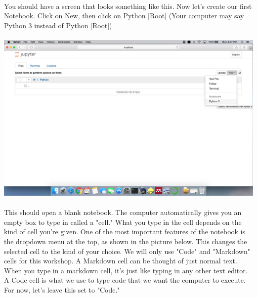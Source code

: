 \documentclass[]{article}
\begin{document}
\paragraph{}
You should have a screen that looks something like this. Now let's create our first Notebook. Click on New, then click on Python [Root] (Your computer may say Python 3 instead of Python [Root])
\paragraph{}
\begin{centering}
    \centerline{\includegraphics[scale=0.35]{Screenshot_20.png}}
\end{centering}

\paragraph{}
This should open a blank notebook. The computer automatically gives you an empty box to type in called a "cell." What you type in the cell depends on the kind of cell you're given. One of the most important features of the notebook is the dropdown menu at the top, as shown in the picture below. This changes the selected cell to the kind of your choice. We will only use "Code" and "Markdown" cells for this workshop. A Markdown cell can be thought of just normal text. When you type in a markdown cell, it's just like typing in any other text editor. A Code cell is what we use to type code that we want the computer to execute. For now, let's leave this set to "Code."
\end{document}
